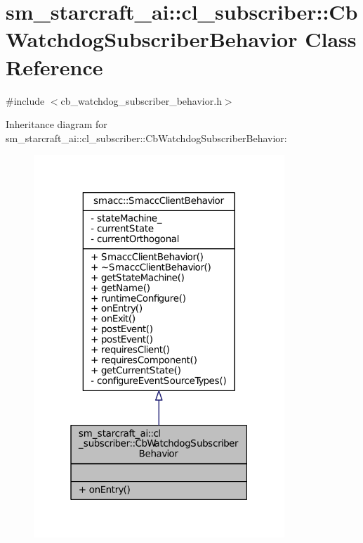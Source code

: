 \hypertarget{classsm__starcraft__ai_1_1cl__subscriber_1_1CbWatchdogSubscriberBehavior}{}\section{sm\+\_\+starcraft\+\_\+ai\+:\+:cl\+\_\+subscriber\+:\+:Cb\+Watchdog\+Subscriber\+Behavior Class Reference}
\label{classsm__starcraft__ai_1_1cl__subscriber_1_1CbWatchdogSubscriberBehavior}


{\ttfamily \#include $<$cb\+\_\+watchdog\+\_\+subscriber\+\_\+behavior.\+h$>$}



Inheritance diagram for sm\+\_\+starcraft\+\_\+ai\+:\+:cl\+\_\+subscriber\+:\+:Cb\+Watchdog\+Subscriber\+Behavior\+:
\nopagebreak
\begin{figure}[H]
\begin{center}
\leavevmode
\includegraphics[width=268pt]{classsm__starcraft__ai_1_1cl__subscriber_1_1CbWatchdogSubscriberBehavior__inherit__graph}
\end{center}
\end{figure}


